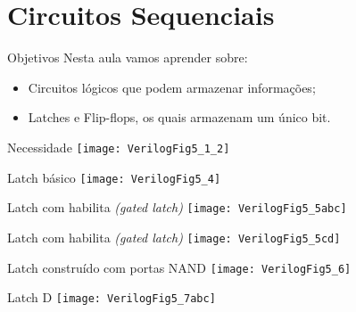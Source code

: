 

\subtitle{Circuitos Sequenciais: Latches e Flip-flops} %



\begin{frame}
	\titlepage
\end{frame} 

\section{Circuitos Sequenciais}

\begin{frame}{Objetivos}   %
    Nesta aula vamos aprender sobre:
    \begin{itemize}
        \item Circuitos lógicos que podem armazenar informações;
        \item Latches e Flip-flops, os quais armazenam um único bit.
    \end{itemize}
\end{frame}

\begin{frame}{Necessidade}   \centering
    \texttt{[image: VerilogFig5\_1\_2]} \\
\end{frame}

\begin{frame}{Latch básico}   \centering
    \texttt{[image: VerilogFig5\_4]} \\
\end{frame}

\begin{frame}{Latch com habilita \textit{(gated latch)}}   \centering
    \texttt{[image: VerilogFig5\_5abc]} \\
\end{frame}

\begin{frame}{Latch com habilita \textit{(gated latch)}}   \centering
    \texttt{[image: VerilogFig5\_5cd]} \\
\end{frame}

\begin{frame}{Latch construído com portas NAND}   \centering
    \texttt{[image: VerilogFig5\_6]} \\
\end{frame}

\begin{frame}{Latch D}   \centering
    \texttt{[image: VerilogFig5\_7abc]} \\
\end{frame}

